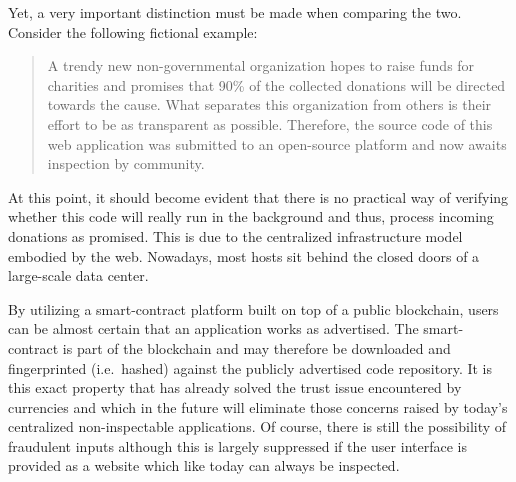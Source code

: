 \FloatBarrier

Yet, a very important distinction must be made when comparing the two. Consider the following fictional example: 

\begin{quotation}
A trendy new non-governmental organization hopes to raise funds for charities and promises that 90\% of the collected donations will be directed towards the cause. What separates this organization from others is their effort to be as transparent as possible. Therefore, the source code of this web application was submitted to an open-source platform and now awaits inspection by community.
\end{quotation}

At this point, it should become evident that there is no practical way of verifying whether this code will really run in the background and thus, process incoming donations as promised. This is due to the centralized infrastructure model embodied by the web. Nowadays, most hosts sit behind the closed doors of a large-scale data center.

By utilizing a smart-contract platform built on top of a public blockchain, users can be almost certain that an application works as advertised. The smart-contract is part of the blockchain and may therefore be downloaded and fingerprinted (i.e.~hashed) against the publicly advertised code repository. It is this exact property that has already solved the trust issue encountered by currencies and which in the future will eliminate those concerns raised by today's centralized non-inspectable applications. Of course, there is still the possibility of fraudulent inputs although this is largely suppressed if the user interface is provided as a website which like today can always be inspected. 


%
	
